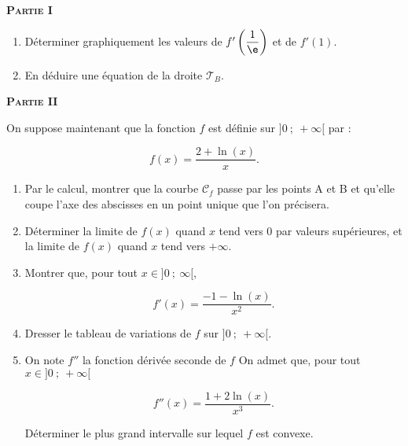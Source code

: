 \medskip

\textbf{\textsc{Partie} I}

\medskip

\begin{enumerate}
\item  Déterminer graphiquement les valeurs de $f'\left(\dfrac{1}{\e}\right)$ et de $f'(1)$.
\item En déduire une équation de la droite $\mathcal{T}_B$.
\end{enumerate}

\textbf{\textsc{Partie} II}

\medskip

On suppose maintenant que la fonction $f$ est définie sur $]0~;~+\infty[$ par : 

\[f(x) =\dfrac{2+\ln(x)}{x}.\]

\begin{enumerate}
\item Par le calcul, montrer que la courbe $\mathcal{C}_f$ passe par les points A et B et qu’elle coupe l’axe des abscisses en un point unique que l’on précisera.
\item Déterminer la limite de $f(x)$ quand $x$ tend vers 0 par valeurs supérieures, et la limite de $f(x)$ quand $x$ tend vers $+\infty$.
\item Montrer que, pour tout $x\in]0~;~\infty[$,

\[f'(x)=\dfrac{-1-\ln(x)}{x^2} .\]

\item Dresser le tableau de variations de $f$ sur $]0~;~+\infty[$.
\item On note $f''$ la fonction dérivée seconde de $f$
On admet que, pour tout $x\in]0~;~+\infty[$ 

\[f''(x)=\dfrac{1+2\ln(x)}{x^3} .\]

Déterminer le plus grand intervalle sur lequel $f$ est convexe.
\end{enumerate}

\bigskip

